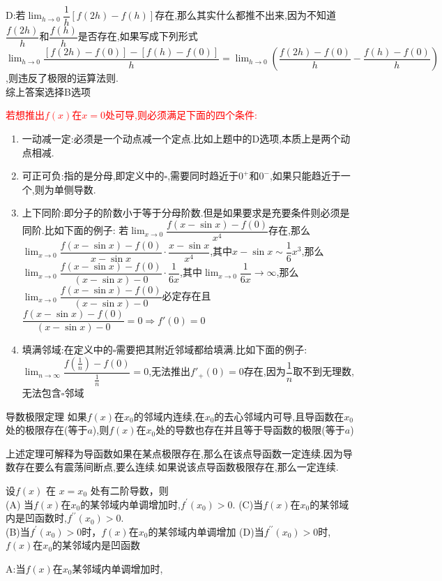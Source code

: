 \documentclass[8pt a4paper, oneside, UTF8]{ctexbook}  %
\begin{document}
\begin{sloppypar}
\begin{solution}
        D:若$\lim_{h \to 0}\dfrac{1}{h}[f(2h)-f(h)]$存在,那么其实什么都推不出来,因为不知道$\dfrac{f(2h)}{h}$和$\dfrac{f(h)}{h}$是否存在,如果写成下列形式$\lim_{h \to 0}\dfrac{[f(2h)-f(0)]-[f(h)-f(0)]}{h}=\lim_{h \to 0}\left(\dfrac{f(2h)-f(0)}{h}-\dfrac{f(h)-f(0)}{h}\right)$,则违反了极限的运算法则.\\
        综上答案选择B选项
    \end{solution}
    \begin{note}
        \textcolor{red}{若想推出$f(x)$在$x=0$处可导,则必须满足下面的四个条件:}
        \begin{enumerate}
            \item 一动减一定:必须是一个动点减一个定点.比如上题中的D选项,本质上是两个动点相减.
            \item 可正可负:指的是分母,即定义中的$\square$,需要同时趋近于$0^+$和$0^-$,如果只能趋近于一个,则为单侧导数.
            \item 上下同阶:即分子的阶数小于等于分母阶数.但是如果要求是充要条件则必须是同阶.比如下面的例子:
            若$\lim_{x\to 0}\dfrac{f(x-\sin x)-f(0)}{x^4}$存在,那么$\lim_{x\to 0}\dfrac{f(x-\sin x)-f(0)}{x-\sin x}\cdot \dfrac{x - \sin x}{x^4}$,其中$ x - \sin x \sim \dfrac{1}{6}x^3$,那么$\lim_{x\to 0}\dfrac{f(x-\sin x)-f(0)}{(x-\sin x)-0}\cdot \dfrac{1}{6x}$,其中$\lim_{x\to 0} \dfrac{1}{6x} \to \infty$,那么$\lim_{x\to 0}\dfrac{f(x-\sin x)-f(0)}{(x-\sin x)-0}$必定存在且$\dfrac{f(x-\sin x)-f(0)}{(x-\sin x)-0}=0 \Rightarrow f'(0)=0$
            \item 填满邻域:在定义中的$\square$需要把其附近邻域都给填满.比如下面的例子:$\lim_{n\to \infty}\dfrac{f(\frac{1}{n})-f(0)}{\frac{1}{n}}=0$,无法推出$f'_+(0)=0$存在,因为$\dfrac{1}{n}$取不到无理数,无法包含$\square$邻域
        \end{enumerate}
    \end{note}
    \begin{them}{导数极限定理}{}\label{dsjxdl}
        如果$f(x)$在$x_0$的邻域内连续,在$x_{0}$的去心邻域内可导,且导函数在$x_{0}$处的极限存在(等于$a$),则$f(x)$在$x_0$处的导数也存在并且等于导函数的极限(等于$a$)
    \end{them}
        上述定理可解释为导函数如果在某点极限存在,那么在该点导函数一定连续.因为导数存在要么有震荡间断点,要么连续.如果说该点导函数极限存在,那么一定连续.
    \begin{problem}
        设$f(x)$ 在 $x=x_0$ 处有二阶导数，则\\
        (A) 当$f(x)$在$x_0$的某邻域内单调增加时,$f^\prime(x_0)>0.$
        (C)当$f(x)$在$x_0$的某邻域内是凹函数时,$f^{\prime\prime}(x_0)>0.$\\
        (B)当$f^\prime(x_0)>0$时，$f(x)$在$x_0$的某邻域内单调增加
        (D)当$f^{\prime\prime}(x_0)>0$时,$f(x)$在$x_0$的某邻域内是凹函数
    \end{problem}
    \begin{solution}
        A:当$f(x)$在$x_0$某邻域内单调增加时,
    \end{solution}
    \begin{note}
            

\end{note}
\end{sloppypar}
\end{document}
